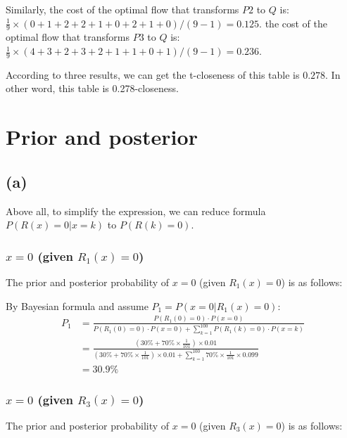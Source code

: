 \documentclass[a4paper,12pt]{article}
\begin{document}
Similarly, the cost of the optimal flow that transforms $P2$ to $Q$ is: $\frac{1}{9}\times(0+1+2+2+1+0+2+1+0)/(9-1) = 0.125$.
the cost of the optimal flow that transforms $P3$ to $Q$ is: $\frac{1}{9}\times(4+3+2+3+2+1+1+0+1)/(9-1) = 0.236$.

According to three results, we can get the t-closeness of this table is $0.278$. In other word, this table is 0.278-closeness.

\section{Prior and posterior}
\subsection{(a)}
Above all, to simplify the expression, we can reduce formula $P(R(x) = 0 | x = k)$ to $P(R(k) = 0)$.

\subsubsection{$x = 0$ (given $R_1(x) = 0$)}
The prior and posterior probability of $x = 0$ (given $R_1(x) = 0$) is as follows:

By Bayesian formula and assume $P_1 = P(x = 0 | R_1(x) = 0)$:
\begin{equation}
    \begin{aligned}
        P_1 & = \frac{P(R_1(0) = 0)\cdot P(x = 0)}{P(R_1(0) = 0)\cdot P(x = 0) + \sum\limits_{k = 1}^{100}P(R_1(k) = 0)\cdot P(x = k)}                                                \\
            & = \frac{(30\% + 70\%\times \frac{1}{101}) \times 0.01}{(30\% + 70\%\times \frac{1}{101}) \times 0.01 + \sum\limits_{k = 1}^{100} 70\%\times \frac{1}{101} \times 0.099} \\
            & = 30.9\%
    \end{aligned}
\end{equation}

\subsubsection{$x = 0$ (given $R_3(x) = 0$)}
The prior and posterior probability of $x = 0$ (given $R_3(x) = 0$) is as follows:
\end{document}
